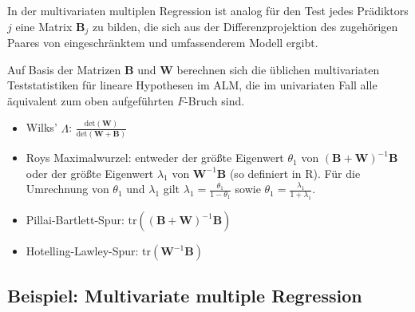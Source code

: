 In der multivariaten multiplen Regression ist analog für den Test jedes Prädiktors $j$ eine Matrix $\bm{B}_{j}$ zu bilden, die sich aus der Differenzprojektion des zugehörigen Paares von eingeschränktem und umfassenderem Modell ergibt.


Auf Basis der Matrizen $\bm{B}$ und $\bm{W}$ berechnen sich die üblichen multivariaten Teststatistiken für lineare Hypothesen im ALM, die im univariaten Fall alle äquivalent zum oben aufgeführten $F$-Bruch sind.

\begin{itemize}
\item Wilks' $\Lambda$: $\frac{\text{det}(\bm{W})}{\text{det}(\bm{W}+\bm{B})}$
\item Roys Maximalwurzel: entweder der größte Eigenwert $\theta_{1}$ von $(\bm{B}+\bm{W})^{-1} \bm{B}$ oder der größte Eigenwert $\lambda_{1}$ von $\bm{W}^{-1} \bm{B}$ (so definiert in R). Für die Umrechnung von $\theta_{1}$ und $\lambda_{1}$ gilt $\lambda_{1} = \frac{\theta_{1}}{1-\theta_{1}}$ sowie $\theta_{1} = \frac{\lambda_{1}}{1+\lambda_{1}}$.
\item Pillai-Bartlett-Spur: $\text{tr}((\bm{B}+\bm{W})^{-1} \bm{B})$
\item Hotelling-Lawley-Spur: $\text{tr}(\bm{W}^{-1} \bm{B})$
\end{itemize}

\subsection{Beispiel: Multivariate multiple Regression}
\label{sec:multALMexRegr}

